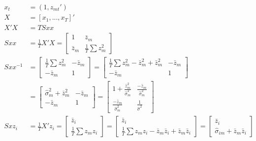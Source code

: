 \documentclass[]{article}
\begin{document}
\begin{align*}
	x_t &= (1, z_{mt}') \\
	X &= [x_1, ..., x_T]' \\
	X'X &= T Sxx\\
	Sxx &= \frac{1}{T}X'X = \left[\begin{array}{cc}
		1 & \bar{z}_m \\
		\bar{z}_m & \frac{1}{T}\sum{z_m^2}
	\end{array}\right] \\	
	Sxx^{-1} &= \left[\begin{array}{cc}
		\frac{1}{T}\sum{z_m^2} & -\bar{z}_m \\
		-\bar{z}_m & 1
	\end{array}\right] = \left[\begin{array}{cc}
		\frac{1}{T}\sum{z_m^2} - \bar{z}_m^2 + \bar{z}_m^2 & -\bar{z}_m \\
		-\bar{z}_m & 1
	\end{array}\right]\\
	&= \left[\begin{array}{cc}
		\hat{\sigma}_m^2 + \bar{z}_m^2 & -\bar{z}_m \\
		-\bar{z}_m & 1
	\end{array}\right] = \left[\begin{array}{cc}
		1 + \frac{\bar{z}_m^2}{\hat{\sigma}_m^2} & \frac{-\bar{z}_m}{\hat{\sigma}_m^2} \\
		\frac{-\bar{z}_m}{\hat{\sigma}_m^2} & \frac{1}{\hat{\sigma}^2}
	\end{array}\right]\\
	Sxz_i &= \frac{1}{T}X'z_i = \left[\begin{array}{c}
		\bar{z}_i \\
		\frac{1}{T}\sum{z_m z_i}
	\end{array}\right] = \left[\begin{array}{c}
		\bar{z}_i \\
		\frac{1}{T}\sum{z_m z_i} - \bar{z}_m \bar{z}_i + \bar{z}_m \bar{z}_i
	\end{array}\right] = \left[\begin{array}{c}
		\bar{z}_i \\
		\hat{\sigma}_{im} + \bar{z}_m \bar{z}_i 
	\end{array}\right] \\
\end{align*}
\end{document}

